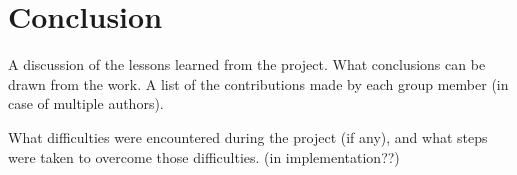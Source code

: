 \section{Conclusion}
A discussion of the lessons learned from the project.
What conclusions can be drawn from the work.
A list of the contributions made by each group member (in case of multiple 
authors).

What difficulties were encountered during the project (if any), and what 
steps were taken to overcome those difficulties. (in implementation??)